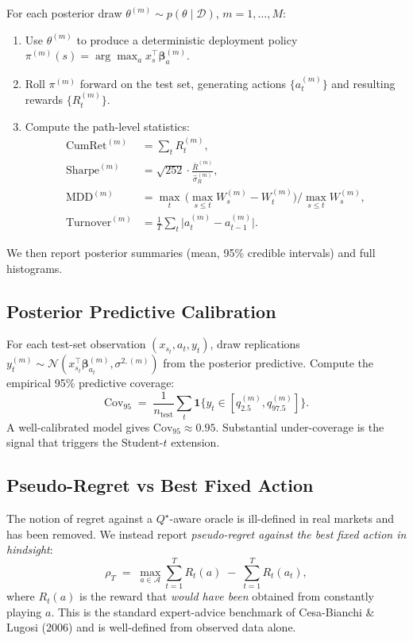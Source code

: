 \documentclass[11pt]{article}
\newcommand{\D}{\mathcal{D}}
\newcommand{\N}{\mathcal{N}}
\begin{document}
For each posterior draw $\theta^{(m)} \sim p(\theta \mid \D)$, $m = 1,\dots,M$:
\begin{enumerate}[leftmargin=*]
\item Use $\theta^{(m)}$ to produce a deterministic deployment policy $\pi^{(m)}(s) = \arg\max_a x_s^\top \bm\beta_a^{(m)}$.
\item Roll $\pi^{(m)}$ forward on the test set, generating actions $\{a_t^{(m)}\}$ and resulting rewards $\{R_t^{(m)}\}$.
\item Compute the path-level statistics:
\begin{align*}
\text{CumRet}^{(m)} &= \sum_t R_t^{(m)}, \\
\text{Sharpe}^{(m)} &= \sqrt{252} \cdot \frac{\bar R^{(m)}}{\hat\sigma_R^{(m)}}, \\
\text{MDD}^{(m)} &= \max_t\,\Big(\max_{s\le t} W_s^{(m)} - W_t^{(m)}\Big)\Big/\max_{s\le t} W_s^{(m)}, \\
\text{Turnover}^{(m)} &= \frac{1}{T}\sum_t \big|a_t^{(m)} - a_{t-1}^{(m)}\big|.
\end{align*}
\end{enumerate}
We then report posterior summaries (mean, 95\% credible intervals) and full histograms.

\subsection{Posterior Predictive Calibration}
For each test-set observation $(x_{s_t}, a_t, y_t)$, draw replications $y_t^{(m)} \sim \N(x_{s_t}^\top \bm\beta_{a_t}^{(m)}, \sigma^{2,(m)})$ from the posterior predictive. Compute the empirical 95\% predictive coverage:
\[
\text{Cov}_{95} \;=\; \frac{1}{n_{\text{test}}}\sum_t \mathbf{1}\{y_t \in [q_{2.5}^{(m)}, q_{97.5}^{(m)}]\}.
\]
A well-calibrated model gives $\text{Cov}_{95} \approx 0.95$. Substantial under-coverage is the signal that triggers the Student-$t$ extension.

\subsection{Pseudo-Regret vs Best Fixed Action}
\label{sec:pseudoregret}

The notion of regret against a $Q^\star$-aware oracle is ill-defined in real markets and has been removed. We instead report \emph{pseudo-regret against the best fixed action in hindsight}:
\begin{equation}
\rho_T \;=\; \max_{a\in\mathcal{A}}\sum_{t=1}^T R_t(a) \;-\; \sum_{t=1}^T R_t(a_t),
\end{equation}
where $R_t(a)$ is the reward that \emph{would have been} obtained from constantly playing $a$. This is the standard expert-advice benchmark of Cesa-Bianchi \& Lugosi (2006) and is well-defined from observed data alone.
\end{document}
